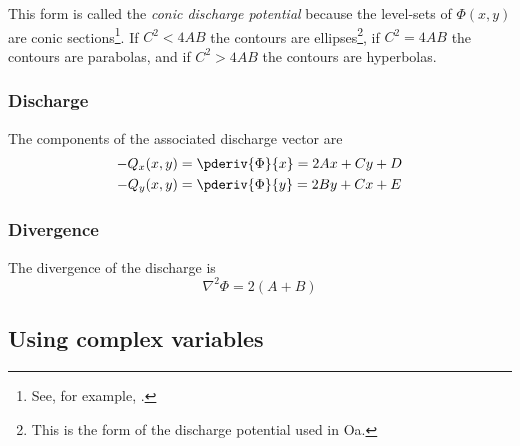 \documentclass[12pt]{article}
\newcommand{\Oneka}{{\textsf{O\raisebox{-0.3ex}{n}\raisebox{0.3ex}{e}\raisebox{-0.3ex}{k}a}}}
\begin{document}
This form is called the {\em conic discharge potential} because the level-sets of $\Phi(x,y)$ are conic sections\footnote{See, for example, \citet{wiki:conic}.}.  If $C^2 < 4AB$ the contours are ellipses\footnote{This is the form of the discharge potential used in {\Oneka}.}, if $C^2 = 4AB$ the contours are parabolas, and if $C^2 > 4AB$ the contours are hyperbolas.

\subsubsection{Discharge}
The components of the associated discharge vector are
%
\begin{align}
    -Q_x(x,y) &= \pderiv{\Phi}{x} = 2Ax + Cy + D \label{7.3}\\
    -Q_y(x,y) &= \pderiv{\Phi}{y} = 2By + Cx + E \label{7.4}
\end{align}

\subsubsection{Divergence}
The divergence of the discharge is
%
\begin{equation}\label{7.5}
    \nabla^2 \Phi = 2(A+B)
\end{equation}

\subsection{Using complex variables}
\end{document}

